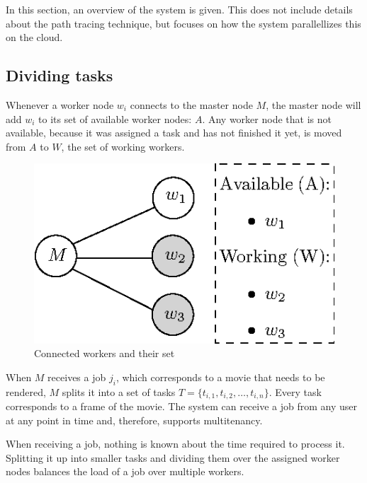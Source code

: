 In this section, an overview of the system is given.
This does not include details about the path tracing technique, but focuses on how the system parallellizes this on the cloud.

\subsection{Dividing tasks}
Whenever a worker node $w_i$ connects to the master node $M$, the master node will add $w_i$ to its set of available worker nodes: $A$.
Any worker node that is not available, because it was assigned a task and has not finished it yet, is moved from $A$ to $W$, the set of working workers.

\begin{figure}[ht!]
    \center
    \includegraphics{./img/masterworkerconnections.eps}
    \caption{Connected workers and their set}
    \label{fig:masterworkerconnections}
\end{figure}

When $M$ receives a job $j_i$, which corresponds to a movie that needs to be rendered, $M$ splits it into a set of tasks $T = \{t_{i,1}, t_{i,2}, \ldots, t_{i,n}\}$.
Every task corresponds to a frame of the movie.
The system can receive a job from any user at any point in time and, therefore, supports multitenancy.

When receiving a job, nothing is known about the time required to process it.
Splitting it up into smaller tasks and dividing them over the assigned worker nodes balances the load of a job over multiple workers.


